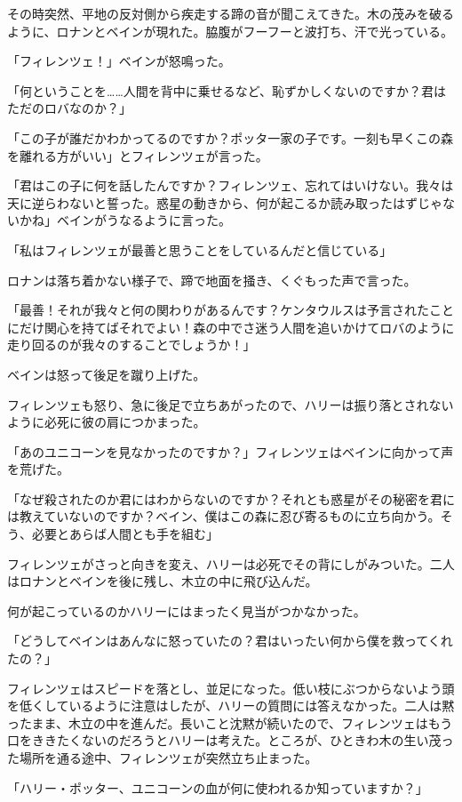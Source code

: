 \documentclass[10pt,a4paper]{article}
\begin{document}
\begin{CJK}{UTF8}{min}
その時突然、平地の反対側から疾走する蹄の音が聞こえてきた。木の茂みを破るように、ロナンとベインが現れた。脇腹がフーフーと波打ち、汗で光っている。

「フィレンツェ！」ベインが怒鳴った。

「何ということを……人間を背中に乗せるなど、恥ずかしくないのですか？君はただのロバなのか？」

「この子が誰だかわかってるのですか？ポッタ一家の子です。一刻も早くこの森を離れる方がいい」とフィレンツェが言った。

「君はこの子に何を話したんですか？フィレンツェ、忘れてはいけない。我々は天に逆らわないと誓った。惑星の動きから、何が起こるか読み取ったはずじゃないかね」ベインがうなるように言った。

「私はフィレンツェが最善と思うことをしているんだと信じている」

ロナンは落ち着かない様子で、蹄で地面を掻き、くぐもった声で言った。

「最善！それが我々と何の関わりがあるんです？ケンタウルスは予言されたことにだけ関心を持てばそれでよい！森の中でさ迷う人間を追いかけてロバのように走り回るのが我々のすることでしょうか！」

ベインは怒って後足を蹴り上げた。

フィレンツェも怒り、急に後足で立ちあがったので、ハリーは振り落とされないように必死に彼の肩につかまった。

「あのユニコーンを見なかったのですか？」フィレンツェはベインに向かって声を荒げた。

「なぜ殺されたのか君にはわからないのですか？それとも惑星がその秘密を君には教えていないのですか？ベイン、僕はこの森に忍び寄るものに立ち向かう。そう、必要とあらば人間とも手を組む」

フィレンツェがさっと向きを変え、ハリーは必死でその背にしがみついた。二人はロナンとベインを後に残し、木立の中に飛び込んだ。

何が起こっているのかハリーにはまったく見当がつかなかった。

「どうしてベインはあんなに怒っていたの？君はいったい何から僕を救ってくれたの？」

フィレンツェはスピードを落とし、並足になった。低い枝にぶつからないよう頭を低くしているように注意はしたが、ハリーの質問には答えなかった。二人は黙ったまま、木立の中を進んだ。長いこと沈黙が続いたので、フィレンツェはもう口をききたくないのだろうとハリーは考えた。ところが、ひときわ木の生い茂った場所を通る途中、フィレンツェが突然立ち止まった。

「ハリー・ポッター、ユニコーンの血が何に使われるか知っていますか？」


\end{CJK}
\end{document}
